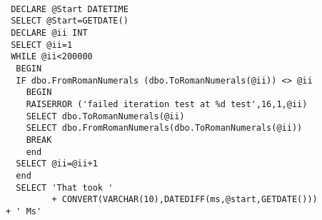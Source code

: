 \begin{enumerate}
\begin{lstlisting}[language=ms_sql,caption={Die Fehlermeldung in SQL Server},label=sql05_04]
  
 DECLARE @Start DATETIME
 SELECT @Start=GETDATE()
 DECLARE @ii INT
 SELECT @ii=1
 WHILE @ii<200000
  BEGIN
  IF dbo.FromRomanNumerals (dbo.ToRomanNumerals(@ii)) <> @ii
    BEGIN
    RAISERROR ('failed iteration test at %d test',16,1,@ii)
    SELECT dbo.ToRomanNumerals(@ii)
    SELECT dbo.FromRomanNumerals(dbo.ToRomanNumerals(@ii))
    BREAK
    end
  SELECT @ii=@ii+1  
  end   
  SELECT 'That took '
         + CONVERT(VARCHAR(10),DATEDIFF(ms,@start,GETDATE()))         + ' Ms'

\end{lstlisting}
\end{enumerate}
\clearpage